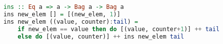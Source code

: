 \begin{lstlisting}[language=haskell]
ins :: Eq a => a -> Bag a -> Bag a
ins new_elem [] = [(new_elem, 1)]
ins new_elem ((value, counter):tail) =
    if new_elem == value then do [(value, counter+1)] ++ tail
    else do [(value, counter)] ++ ins new_elem tail
\end{lstlisting}